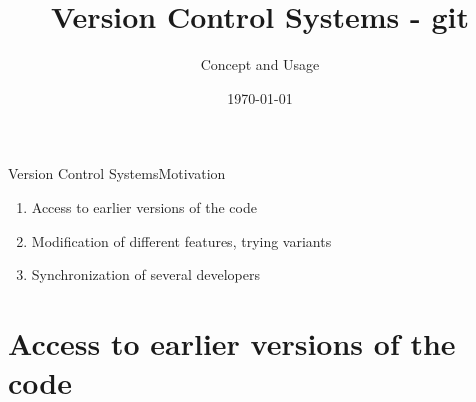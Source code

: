 \documentclass{setbeamer}
\title{Version Control Systems - git}
\subtitle{Concept and Usage}
\institute{\theChairName\\\theDepartmentName\\\theUniversityName}
\date[\today]{\today}
\begin{document}
\maketitle

\begin{frame}{Version Control Systems}{Motivation}
    \begin{enumerate}
        \item Access to earlier versions of the code
        \item Modification of different features, trying variants
        \item Synchronization of several developers
    \end{enumerate}
\end{frame}



\section{Access to earlier versions of the code}
\end{document}
